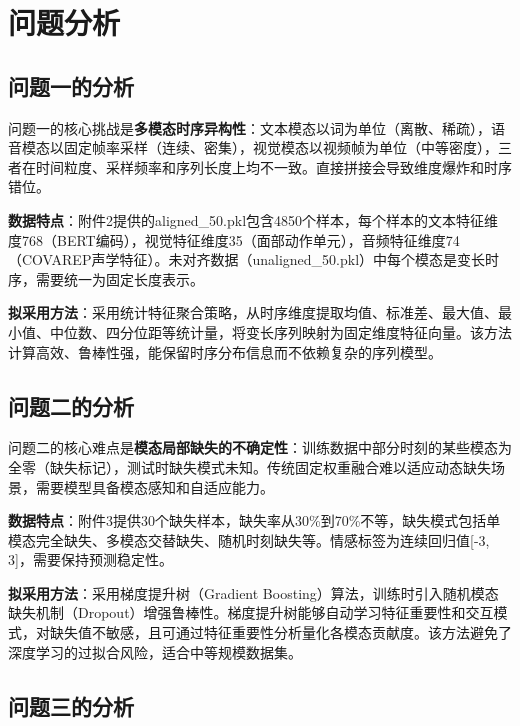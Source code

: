 \section{问题分析}


\subsection{问题一的分析}

问题一的核心挑战是\textbf{多模态时序异构性}：文本模态以词为单位（离散、稀疏），语音模态以固定帧率采样（连续、密集），视觉模态以视频帧为单位（中等密度），三者在时间粒度、采样频率和序列长度上均不一致。直接拼接会导致维度爆炸和时序错位。

\textbf{数据特点}：附件2提供的aligned\_50.pkl包含4850个样本，每个样本的文本特征维度768（BERT编码），视觉特征维度35（面部动作单元），音频特征维度74（COVAREP声学特征）。未对齐数据（unaligned\_50.pkl）中每个模态是变长时序，需要统一为固定长度表示。

\textbf{拟采用方法}：采用统计特征聚合策略，从时序维度提取均值、标准差、最大值、最小值、中位数、四分位距等统计量，将变长序列映射为固定维度特征向量。该方法计算高效、鲁棒性强，能保留时序分布信息而不依赖复杂的序列模型。

\subsection{问题二的分析}

问题二的核心难点是\textbf{模态局部缺失的不确定性}：训练数据中部分时刻的某些模态为全零（缺失标记），测试时缺失模式未知。传统固定权重融合难以适应动态缺失场景，需要模型具备模态感知和自适应能力。

\textbf{数据特点}：附件3提供30个缺失样本，缺失率从30\%到70\%不等，缺失模式包括单模态完全缺失、多模态交替缺失、随机时刻缺失等。情感标签为连续回归值[-3, 3]，需要保持预测稳定性。

\textbf{拟采用方法}：采用梯度提升树（Gradient Boosting）算法，训练时引入随机模态缺失机制（Dropout）增强鲁棒性。梯度提升树能够自动学习特征重要性和交互模式，对缺失值不敏感，且可通过特征重要性分析量化各模态贡献度。该方法避免了深度学习的过拟合风险，适合中等规模数据集。

\subsection{问题三的分析}

